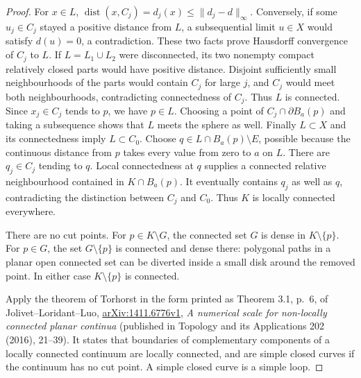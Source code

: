 \documentclass[12pt]{amsart}
\numberwithin{equation}{section}
\begin{document}
\begin{proof}
For $x\in L$,
$\operatorname{dist}(x,C_j)=d_j(x)\leq\|d_j-d\|_\infty$.
Conversely, if some $u_j\in C_j$ stayed a positive distance
from $L$, a subsequential limit $u\in X$ would satisfy $d(u)=0$,
a contradiction. These two facts prove Hausdorff convergence
of $C_j$ to $L$. If $L=L_1\cup L_2$ were disconnected,
its two nonempty compact relatively closed parts would have
positive distance. Disjoint sufficiently small neighbourhoods
of the parts would contain $C_j$ for large $j$, and $C_j$
would meet both neighbourhoods, contradicting connectedness
of $C_j$. Thus $L$ is connected. Since $x_j\in C_j$ tends
to $p$, we have $p\in L$. Choosing a point of
$C_j\cap\partial B_a(p)$ and taking a subsequence shows that
$L$ meets the sphere as well. Finally $L\subset X$ and its
connectedness imply $L\subset C_0$.
Choose $q\in L\cap B_a(p)\setminus E$, possible because the
continuous distance from $p$ takes every value from zero to
$a$ on $L$. There are $q_j\in C_j$ tending to $q$.
Local connectedness at $q$ supplies a connected relative
neighbourhood contained in $K\cap B_a(p)$. It eventually
contains $q_j$ as well as $q$, contradicting the distinction
between $C_j$ and $C_0$. Thus $K$ is locally connected everywhere.

There are no cut points. For $p\in K\setminus G$, the connected
set $G$ is dense in $K\setminus\{p\}$. For $p\in G$, the set
$G\setminus\{p\}$ is connected and dense there: polygonal
paths in a planar open connected set can be diverted inside
a small disk around the removed point. In either case
$K\setminus\{p\}$ is connected.

Apply the theorem of Torhorst in the form printed as Theorem 3.1,
p.~6, of Jolivet--Loridant--Luo,
\href{https://arxiv.org/abs/1411.6776v1}{arXiv:1411.6776v1},
\emph{A numerical scale for non-locally connected planar
continua} (published in Topology and its Applications 202
(2016), 21--39). It states that boundaries of complementary
components of a locally connected continuum are locally
connected, and are simple closed curves if the continuum has
no cut point. A simple closed curve is a simple loop.
	\end{proof}
	
	
	
\end{document}
